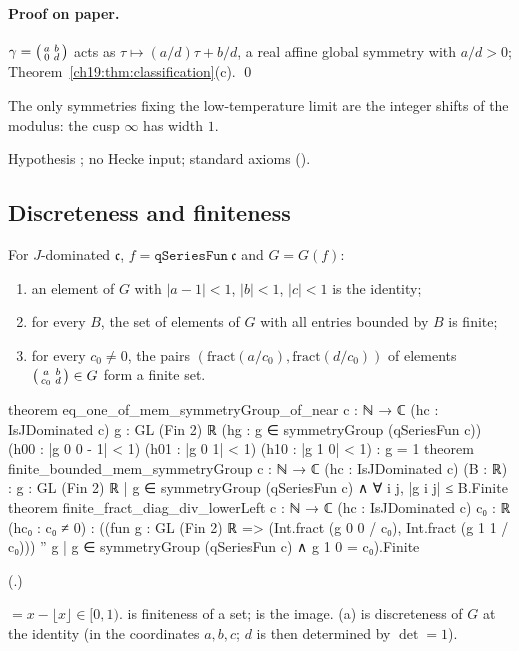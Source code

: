 \paragraph{Proof on paper.}  $\gamma=\left(\begin{smallmatrix}a&b\\0&d\end{smallmatrix}\right)$ acts as $\tau\mapsto(a/d)\tau+b/d$, a real affine global symmetry with $a/d>0$;
Theorem~\ref{ch19:thm:classification}(c). \qed
\begin{physics}The only symmetries fixing the low-temperature limit are the integer shifts of the modulus: the cusp $\infty$ has width
$1$.\end{physics}
\begin{status}Hypothesis ; no Hecke input; standard axioms ().\end{status}

\subsection{Discreteness and finiteness}

\begin{theorem}\label{ch19:thm:discrete}
For $J$-dominated $\mathfrak c$, $f=\mathtt{qSeriesFun}\ \mathfrak c$ and $G=G(f)$:
\begin{enumerate}[label=(\alph*)]
\item an element of $G$ with $|a-1|<1$, $|b|<1$, $|c|<1$ is the identity;
\item for every $B$, the set of elements of $G$ with all entries bounded by $B$ is finite;
\item for every $c_0\ne0$, the pairs $(\mathrm{fract}(a/c_0),\mathrm{fract}(d/c_0))$ of elements $\left(\begin{smallmatrix}a&b\\c_0&d\end{smallmatrix}\right)\in G$ form a finite set.
\end{enumerate}
\end{theorem}
\begin{leancode}
theorem eq_one_of_mem_symmetryGroup_of_near {c : ℕ → ℂ} (hc : IsJDominated c)
    {g : GL (Fin 2) ℝ} (hg : g ∈ symmetryGroup (qSeriesFun c)) (h00 : |g 0 0 - 1| < 1)
    (h01 : |g 0 1| < 1) (h10 : |g 1 0| < 1) : g = 1
theorem finite_bounded_mem_symmetryGroup {c : ℕ → ℂ} (hc : IsJDominated c) (B : ℝ) :
    {g : GL (Fin 2) ℝ | g ∈ symmetryGroup (qSeriesFun c) ∧ ∀ i j, |g i j| ≤ B}.Finite
theorem finite_fract_diag_div_lowerLeft {c : ℕ → ℂ} (hc : IsJDominated c) {c₀ : ℝ}
    (hc₀ : c₀ ≠ 0) :
    ((fun g : GL (Fin 2) ℝ => (Int.fract (g 0 0 / c₀), Int.fract (g 1 1 / c₀))) ''
      {g | g ∈ symmetryGroup (qSeriesFun c) ∧ g 1 0 = c₀}).Finite
\end{leancode}
(.)
\begin{dictionary}
 $=x-\lfloor x\rfloor\in[0,1)$.   is finiteness of a set;  is the image.  (a) is
discreteness of $G$ at the identity (in the coordinates $a,b,c$; $d$ is then determined by $\det=1$).
\end{dictionary}
